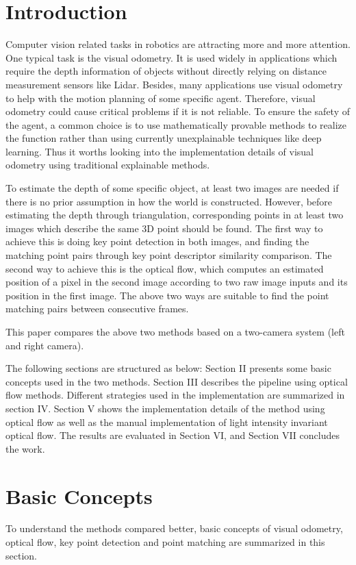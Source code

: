 \documentclass[11pt]{easychair}
\begin{document}
\section{Introduction}
Computer vision related tasks in robotics are attracting more and more attention. One typical task is the visual odometry. It is used widely in applications which require the depth information of objects without directly relying on distance measurement sensors like Lidar. Besides, many applications use visual odometry to help with the motion planning of some specific agent. Therefore, visual odometry could cause critical problems if it is not reliable. To ensure the safety of the agent, a common choice is to use mathematically provable methods to realize the function rather than using currently unexplainable techniques like deep learning. Thus it worths looking into the implementation details of visual odometry using traditional explainable methods.

To estimate the depth of some specific object, at least two images are needed if there is no prior assumption in how the world is constructed. However, before estimating the depth through triangulation, corresponding points in at least two images which describe the same 3D point should be found. The first way to achieve this is doing key point detection in both images, and finding the matching point pairs through key point descriptor similarity comparison. The second way to achieve this is the optical flow, which computes an estimated position of a pixel in the second image according to two raw image inputs and its position in the first image. The above two ways are suitable to find the point matching pairs between consecutive frames. 

This paper compares the above two methods based on a two-camera system (left and right camera).

The following sections are structured as below: Section II presents some basic concepts used in the two methods. Section III describes the pipeline using optical flow methods. Different strategies used in the implementation are summarized in section IV. Section V shows the implementation details of the method using optical flow as well as the manual implementation of light intensity invariant optical flow. The results are evaluated in Section VI, and Section VII concludes the work.


\section{Basic Concepts}
To understand the methods compared better, basic concepts of visual odometry, optical flow, key point detection and point matching are summarized in this section.
\end{document}
